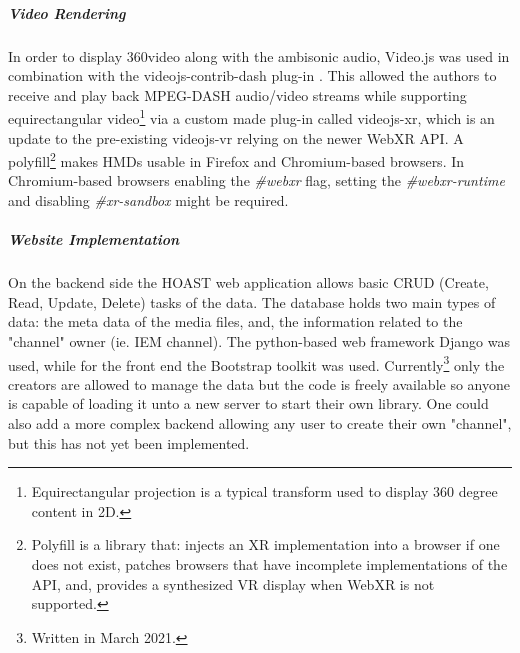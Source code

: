\subparagraph{Video Rendering}

In order to display 360\textdegree video along with the ambisonic audio, Video.js was used in combination with the videojs-contrib-dash plug-in \cite{deppisch2020hoast}. This allowed the authors to receive and play back MPEG-DASH audio/video streams while supporting equirectangular video\footnote{Equirectangular projection is a typical transform used to display 360 degree content in 2D.} via a custom made plug-in called videojs-xr, which is an update to the pre-existing videojs-vr relying on the newer WebXR API. A polyfill\footnote{Polyfill is a library that: injects an XR implementation into a browser if one does not exist, patches browsers that have incomplete implementations of the API, and, provides a synthesized VR display when WebXR is not supported.} makes HMDs usable in Firefox and Chromium-based browsers. In Chromium-based browsers enabling the \textit{\#webxr} flag, setting the \textit{\#webxr-runtime} and disabling \textit{\#xr-sandbox} might be required.

\subparagraph{Website Implementation}

On the backend side the HOAST web application allows basic CRUD (Create, Read, Update, Delete) tasks of the data. The database holds two main types of data: the meta data of the media files, and, the information related to the "channel" owner (ie. IEM channel). The python-based web framework Django was used, while for the front end the Bootstrap toolkit was used. Currently\footnote{Written in March 2021.} only the creators are allowed to manage the data but the code is freely available so anyone is capable of loading it unto a new server to start their own library. One could also add a more complex backend allowing any user to create their own "channel", but this has not yet been implemented.




